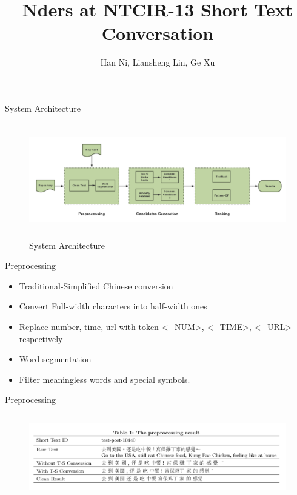 \documentclass[aspectratio=169]{beamer}
\title{Nders at NTCIR-13 Short Text Conversation }
\author{Han Ni, Liansheng Lin, Ge Xu}
\institute{NetDragon WebSoft Inc.}
\begin{document}
  \maketitle


    \begin{frame}{System Architecture}
      \begin{figure}
      \includegraphics[width=15cm,height=4.96cm]{stc-flow-h.png}
      \caption{System Architecture}
      \end{figure}
    \end{frame}

    \begin{frame}{Preprocessing}
      \begin{itemize}
        \item Traditional-Simplified Chinese conversion
        \item Convert Full-width characters into half-width ones
        \item Replace number, time, url with token <\_NUM>, <\_TIME>, <\_URL> respectively
        \item Word segmentation
        \item Filter meaningless words and special symbols.
      \end{itemize}
    \end{frame}

    \begin{frame}{Preprocessing}
      \begin{figure}
      \includegraphics[width=14cm,height=3.68cm]{preprocessing-result.png}
      \end{figure}
    \end{frame}
\end{document}

